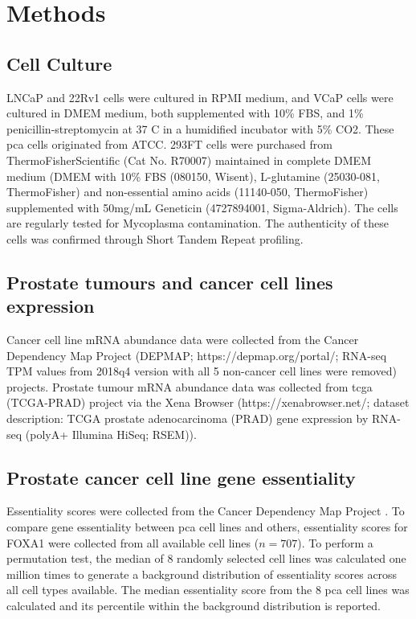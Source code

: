 \section{Methods}
\label{sec:FOXA1_methods}

\subsection{Cell Culture}

LNCaP and 22Rv1 cells were cultured in RPMI medium, and VCaP cells were cultured in DMEM medium, both supplemented with 10\% FBS, and 1\% penicillin-streptomycin at 37 \textdegree C in a humidified incubator with 5\% CO2.
These \gls{pca} cells originated from ATCC.
293FT cells were purchased from ThermoFisherScientific (Cat No. R70007) maintained in complete DMEM medium (DMEM with 10\% FBS (080150, Wisent), L-glutamine (25030-081, ThermoFisher) and non-essential amino acids (11140-050, ThermoFisher) supplemented with 50mg/mL Geneticin (4727894001, Sigma-Aldrich).
The cells are regularly tested for Mycoplasma contamination.
The authenticity of these cells was confirmed through Short Tandem Repeat profiling.

\subsection{Prostate tumours and cancer cell lines expression}

Cancer cell line mRNA abundance data were collected from the Cancer Dependency Map Project (DEPMAP; https://depmap.org/portal/; RNA-seq TPM values from 2018q4 version with all 5 non-cancer cell lines were removed) \cite{thecancercelllineencyclopediaconsortiumPharmacogenomicAgreementTwo2015} projects.
Prostate tumour mRNA abundance data was collected from \gls{tcga}  (TCGA-PRAD) project via the Xena Browser (https://xenabrowser.net/; dataset description: TCGA prostate adenocarcinoma (PRAD) gene expression by RNA-seq (polyA+ Illumina HiSeq; RSEM)).

\subsection{Prostate cancer cell line gene essentiality}

Essentiality scores were collected from the Cancer Dependency Map Project \cite{mcfarlandImprovedEstimationCancer2018}.
To compare gene essentiality between \gls{pca} cell lines and others, essentiality scores for FOXA1 were collected from all available cell lines ($n = 707$).
To perform a permutation test, the median of 8 randomly selected cell lines was calculated one million times to generate a background distribution of essentiality scores across all cell types available.
The median essentiality score from the 8 \gls{pca} cell lines was calculated and its percentile within the background distribution is reported.

